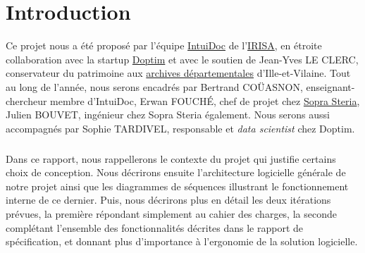 \chapter{Introduction}
\setcounter{page}{1}
\pagestyle{fancy}
\fancyhf{}
\cfoot[\thepage]{\thepage}

Ce projet nous a été proposé par l’équipe \href{https://www-intuidoc.irisa.fr/}{IntuiDoc} de l’\href{https://www.irisa.fr/}{IRISA}, en étroite collaboration avec la startup \href{http://www.doptim.eu}{Doptim} et avec le soutien de Jean-Yves LE CLERC, conservateur du patrimoine aux \href{http://archives.ille-et-vilaine.fr/fr}{archives départementales} d'Ille-et-Vilaine. Tout au long de l’année, nous serons encadrés par Bertrand COÜASNON, enseignant-chercheur membre d'IntuiDoc, Erwan FOUCHÉ, chef de projet chez \href{https://www.soprasteria.com/fr}{Sopra Steria}, Julien BOUVET, ingénieur chez Sopra Steria également. Nous serons aussi accompagnés par Sophie TARDIVEL, responsable et \textit{data scientist} chez Doptim.

\paragraph{}
Dans ce rapport, nous rappellerons le contexte du projet qui justifie certains choix de conception. Nous décrirons ensuite l’architecture logicielle générale de notre projet ainsi que les diagrammes de séquences illustrant le fonctionnement interne de ce dernier. Puis, nous décrirons plus en détail les deux itérations prévues, la première répondant simplement au cahier des charges, la seconde complétant l'ensemble des fonctionnalités décrites dans le rapport de spécification, et donnant plus d'importance à l'ergonomie de la solution logicielle.
